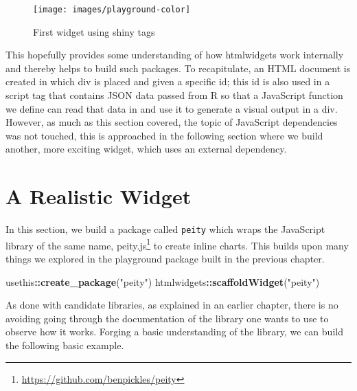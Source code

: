 \documentclass[
  10pt,
]{krantz}
\makeatletter
\newenvironment{Shaded}{\begin{snugshade}}{\end{snugshade}}
\newcommand{\KeywordTok}[1]{\textcolor[rgb]{0.27,0.27,0.27}{\textbf{#1}}}
\newcommand{\NormalTok}[1]{#1}
\newcommand{\OperatorTok}[1]{\textcolor[rgb]{0.43,0.43,0.43}{\textbf{#1}}}
\newcommand{\StringTok}[1]{\textcolor[rgb]{0.5,0.5,0.5}{#1}}
\renewcommand{\href}[2]{#2\footnote{\url{#1}}}
\newenvironment{kframe}{%
\medskip{}
\setlength{\fboxsep}{.8em}
 \def\at@end@of@kframe{}%
 \ifinner\ifhmode%
  \def\at@end@of@kframe{\end{minipage}}%
  \begin{minipage}{\columnwidth}%
 \fi\fi%
 \def\FrameCommand##1{\hskip\@totalleftmargin \hskip-\fboxsep
 \colorbox{shadecolor}{##1}\hskip-\fboxsep
     \hskip-\linewidth \hskip-\@totalleftmargin \hskip\columnwidth}%
 \MakeFramed {\advance\hsize-\width
   \@totalleftmargin\z@ \linewidth\hsize
   \@setminipage}}%
 {\par\unskip\endMakeFramed%
 \at@end@of@kframe}
\renewenvironment{Shaded}{\begin{kframe}}{\end{kframe}}
\makeatother
\begin{document}
\begin{figure}[H]

{\centering \texttt{[image: images/playground-color]} 

}

\caption{First widget using shiny tags}\label{fig:playground-tags}
\end{figure}

This hopefully provides some understanding of how htmlwidgets work internally and thereby helps to build such packages. To recapitulate, an HTML document is created in which div is placed and given a specific id; this id is also used in a script tag that contains JSON data passed from R so that a JavaScript function we define can read that data in and use it to generate a visual output in a div. However, as much as this section covered, the topic of JavaScript dependencies was not touched, this is approached in the following section where we build another, more exciting widget, which uses an external dependency.

\hypertarget{widgets-realistic}{%
\chapter{A Realistic Widget}\label{widgets-realistic}}

In this section, we build a package called \texttt{peity} which wraps the JavaScript library of the same name, \href{https://github.com/benpickles/peity}{peity.js} to create inline charts. This builds upon many things we explored in the playground package built in the previous chapter.

\begin{Shaded}
\begin{Highlighting}[]
\NormalTok{usethis}\OperatorTok{::}\KeywordTok{create\_package}\NormalTok{(}\StringTok{"peity"}\NormalTok{)}
\NormalTok{htmlwidgets}\OperatorTok{::}\KeywordTok{scaffoldWidget}\NormalTok{(}\StringTok{"peity"}\NormalTok{)}
\end{Highlighting}
\end{Shaded}

As done with candidate libraries, as explained in an earlier chapter, there is no avoiding going through the documentation of the library one wants to use to observe how it works. Forging a basic understanding of the library, we can build the following basic example.
\end{document}
